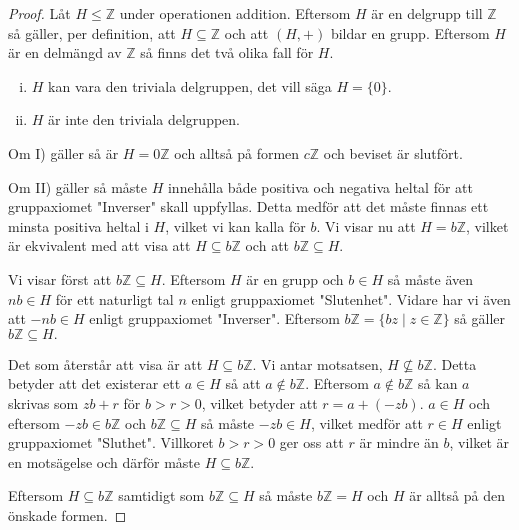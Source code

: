 \documentclass{article}
\theoremstyle{definition}
\begin{document}
\begin{proof}
  Låt $H \le \mathbb{Z}$ under operationen addition. 
  Eftersom $H$ är en delgrupp till $\mathbb{Z}$ så gäller, per definition, att 
  $H \subseteq \mathbb{Z}$ och att $(H, +)$ bildar en grupp. 
  Eftersom $H$ är en delmängd av $\mathbb{Z}$ så finns det två olika fall för $H$.
  \begin{enumerate}[(i)]
    \item $H$ kan vara den triviala delgruppen, det vill säga $H = \{0\}$. 
    \item $H$ är inte den triviala delgruppen.
  \end{enumerate}
  Om I) gäller så är $H = 0 \mathbb{Z}$ och alltså på formen $c \mathbb{Z}$ och beviset är 
  slutfört.
  
  Om II) gäller så måste $H$ innehålla både positiva och negativa heltal för att 
  gruppaxiomet "Inverser" skall uppfyllas. Detta medför att det måste finnas 
  ett minsta positiva heltal i $H$, vilket vi kan kalla för $b$.
  Vi visar nu att $H = b \mathbb{Z}$, 
  vilket är ekvivalent med att visa att $H \subseteq b \mathbb{Z}$
  och att $b \mathbb{Z} \subseteq H.$

  Vi visar först att $b \mathbb{Z} \subseteq H.$   
  Eftersom $H$ är en grupp och $b \in H$ så måste 
  även $nb \in H$ för ett naturligt tal $n$ enligt gruppaxiomet "Slutenhet". 
  Vidare har vi även att $-nb \in H$ enligt gruppaxiomet "Inverser".
  Eftersom 
  $b \mathbb{Z} = \{bz \; | \; z \in \mathbb{Z}\}$ så gäller $b \mathbb{Z} \subseteq H.$

  Det som återstår att visa är att $H \subseteq b \mathbb{Z}$. Vi antar motsatsen, 
  $H \not\subseteq b \mathbb{Z}$. Detta betyder att det existerar ett 
  $a \in H$ så att $a \notin b\mathbb{Z}.$ Eftersom $a \notin b\mathbb{Z}$ så 
  kan $a$ skrivas som $zb + r$ för $b > r > 0$, vilket betyder 
  att $r = a + (-zb)$. $a \in H$ och eftersom $-zb \in b \mathbb{Z}$ och $b \mathbb{Z} \subseteq H$ 
  så måste
  $-zb \in H$, vilket medför att $r \in H$ enligt gruppaxiomet "Sluthet". Villkoret $b > r > 0$ ger oss att $r$ är mindre än $b$, vilket är en motsägelse och därför 
  måste $H \subseteq b \mathbb{Z}$.
  
  Eftersom $H \subseteq b \mathbb{Z}$ samtidigt som $b \mathbb{Z} \subseteq H$ så måste 
  $b \mathbb{Z} = H$ och $H$ är alltså på den önskade formen.
\end{proof}



\end{document}
